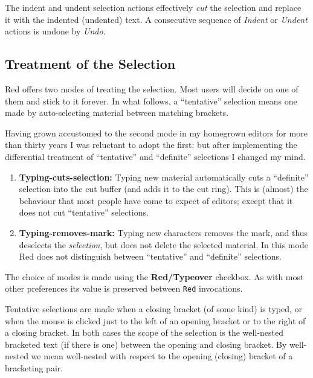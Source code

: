 \documentclass[11pt,a4paper]{article}
\begin{document}
The indent and undent selection actions effectively \emph{cut} the
selection and replace it with the indented (undented) text. A
consecutive sequence of \emph{Indent} or \emph{Undent} actions
is undone by \emph{Undo}.



\hypertarget{treatment-of-the-selection}{%
\subsection{Treatment of the
Selection}\label{treatment-of-the-selection}}

Red offers two modes of treating the selection. Most users will decide
on one of them and stick to it forever. In what follows, a ``tentative''
selection means one made by auto-selecting material between matching
brackets.

Having grown accustomed to the second mode in my homegrown editors for
more than thirty years I was reluctant to adopt the first: but after
implementing the differential treatment of ``tentative'' and
``definite'' selections I changed my mind.

\begin{enumerate}
\def\labelenumi{\arabic{enumi}.}
\item
  \textbf{Typing-cuts-selection:} Typing new material automatically cuts
  a ``definite'' selection into the cut buffer (and adds it to the cut
  ring). This is (almost) the behaviour that most people have come to
  expect of editors; except that it does not cut ``tentative''
  selections.
\item
  \textbf{Typing-removes-mark:} Typing new characters removes the mark,
  and thus deselects the \emph{selection}, but does not delete the
  selected material. In this mode Red does not distinguish between
  ``tentative'' and ``definite'' selections.
\end{enumerate}

The choice of modes is made using the \textbf{Red/Typeover} checkbox. As
with most other preferences its value is preserved between \texttt{Red}
invocations.

Tentative selections are made when a closing bracket (of some kind) is
typed, or when the mouse is clicked just to the left of an opening
bracket or to the right of a closing bracket. In both cases the scope of
the selection is the well-nested bracketed text (if there is one)
between the opening and closing bracket. By well-nested we mean
well-nested with respect to the opening (closing) bracket of a
bracketing pair.
\end{document}
